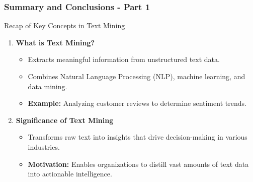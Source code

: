 \documentclass[aspectratio=169]{beamer}
\begin{document}
\begin{frame}[fragile]
    \frametitle{Summary and Conclusions - Part 1}
    \begin{block}{Recap of Key Concepts in Text Mining}
        \begin{enumerate}
            \item \textbf{What is Text Mining?}
            \begin{itemize}
                \item Extracts meaningful information from unstructured text data.
                \item Combines Natural Language Processing (NLP), machine learning, and data mining.
                \item \textbf{Example:} Analyzing customer reviews to determine sentiment trends.
            \end{itemize}

            \item \textbf{Significance of Text Mining}
            \begin{itemize}
                \item Transforms raw text into insights that drive decision-making in various industries.
                \item \textbf{Motivation:} Enables organizations to distill vast amounts of text data into actionable intelligence.
            \end{itemize}
        \end{enumerate}
    \end{block}
\end{frame}
\end{document}
